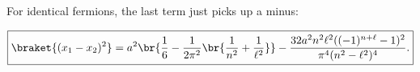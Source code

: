 \begin{parts}
\item For identical fermions, the last term just picks up a minus:

  \begin{equation}
    \boxed{\braket{(x_1 - x_2)^2} = a^2 \br{ \frac{1}{6} - \frac{1}{2\pi^2}\br{\frac{1}{n^2} + \frac{1}{\ell^2}} } - \frac{32a^2 n^2 \ell^2((-1)^{n+\ell} - 1)^2 }{\pi^4(n^2 - \ell^2)^4}.}
  \end{equation}
  
\end{parts}



